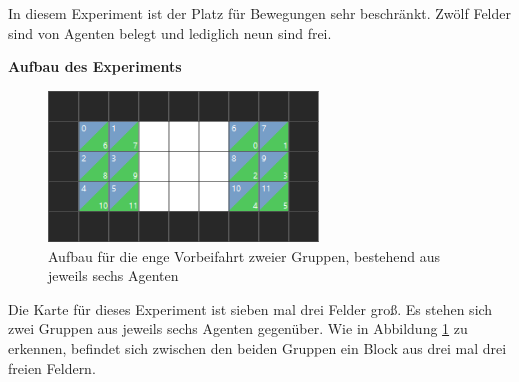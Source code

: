 In diesem Experiment ist der Platz für Bewegungen sehr beschränkt. Zwölf Felder sind von Agenten belegt und lediglich neun sind frei. 

\textbf{Aufbau des Experiments}
\begin{figure}[H]
    \includegraphics[height=40mm]{images/6vs6_tight.png}
    \centering
    \caption{Aufbau für die enge Vorbeifahrt zweier Gruppen, bestehend aus jeweils sechs Agenten}
    \label{fig:6x6Eng}
\end{figure}
Die Karte für dieses Experiment ist sieben mal drei Felder groß. Es stehen sich zwei Gruppen aus jeweils sechs Agenten gegenüber. Wie in Abbildung \ref{fig:6x6Eng} zu erkennen, befindet sich zwischen den beiden Gruppen ein Block aus drei mal drei freien Feldern.